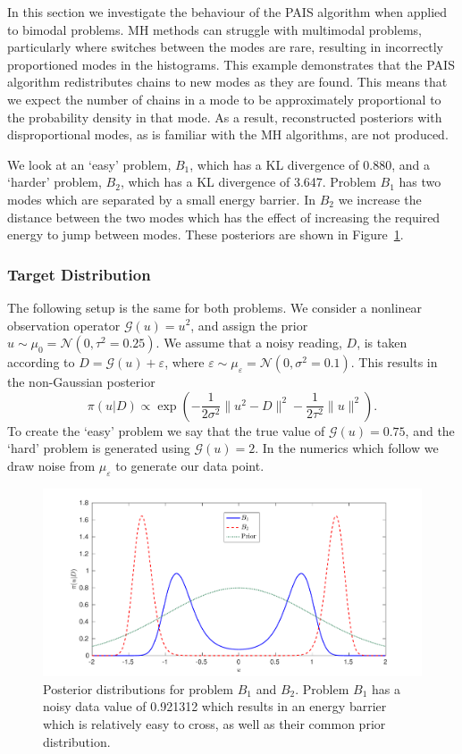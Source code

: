 \documentclass[final]{siamltex}
\newcommand{\G}{\mathcal{G}}
\newcommand{\N}{\mathcal{N}}
\begin{document}
In this section we investigate the behaviour of the PAIS algorithm
when applied to bimodal problems. MH methods can
struggle with multimodal problems, particularly where switches between
the modes are rare, resulting in incorrectly proportioned modes in the
histograms. This example demonstrates that the PAIS algorithm redistributes 
chains to new modes as they are found. This means that we expect the number of chains in a mode to be
approximately proportional to the probability density in that mode. As a result, reconstructed posteriors with disproportional modes, as is familiar with the MH algorithms, are not produced.

We look at an `easy' problem, $B_1$, which has a KL divergence of 0.880, and a `harder' problem, $B_2$, which has a KL divergence of 3.647. Problem $B_1$ has two modes which are separated by a small energy barrier. In $B_2$ we increase the distance between the two modes which has the effect of increasing the required energy to jump between modes. These posteriors are shown in Figure~\ref{fig:problem 3 posteriors}.

\subsubsection{Target Distribution}

The following setup is the same for both problems. We consider a nonlinear observation operator $\G(u) = u^2$, and assign the prior $u \sim \mu_0 = \N(0, \tau^2=0.25)$. We assume that a noisy reading, $D$, is taken according to $D = \G(u) + \varepsilon$, where $\varepsilon \sim \mu_\varepsilon = \N(0, \sigma^2 = 0.1)$. This results in the non-Gaussian posterior
\[
	\pi(u|D) \propto \exp\left(-\frac{1}{2\sigma^2}\|u^2 - D\|^2 - \frac{1}{2\tau^2}\|u\|^2\right).
\]
To create the `easy' problem we say that the true value of $\G(u) = 0.75$, and the `hard' problem is generated using $\G(u) = 2$. In the numerics which follow we draw noise from $\mu_\varepsilon$ to generate our data point.

\begin{figure}[htpb]
\begin{center}
\includegraphics[width=\textwidth]{"figures/posteriors3"}
\caption{Posterior distributions for problem $B_1$ and $B_2$. Problem $B_1$ has a noisy data value of  0.921312 which results in an energy barrier which is relatively easy to cross, as well as their common prior distribution.}
\label{fig:problem 3 posteriors}
\end{center}
\end{figure}
\end{document}
